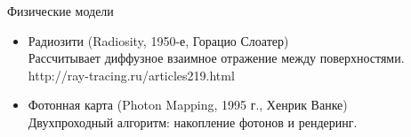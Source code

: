 \documentclass{beamer}
\begin{document}
	\begin{frame}{Физические модели}
		\begin{itemize}
			\item 
			Радиозити (Radiosity, 1950-е, Горацио Слоатер)\\
			Рассчитывает диффузное взаимное отражение между поверхностями.\\
			[Источник: Основы заложены в 1950-х, компьютерное применение — 1984]
			http://ray-tracing.ru/articles219.html

			\item 
			Фотонная карта (Photon Mapping, 1995 г., Хенрик Ванке)\\
			Двухпроходный алгоритм: накопление фотонов и рендеринг.\\
			[Источник: «Global Illumination Using Photon Maps», Henrik Wann Jensen, 1995]
		
		\end{itemize}
		
	\end{frame}
\end{document}
